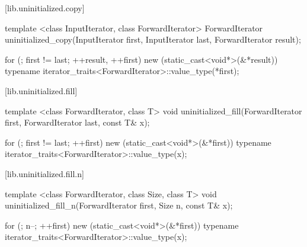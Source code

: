 [lib.uninitialized.copy]{}

%
\begin{itemdecl}
template <class InputIterator, class ForwardIterator>
  ForwardIterator
    uninitialized_copy(InputIterator first, InputIterator last,
                       ForwardIterator result);
\end{itemdecl}

\begin{itemdescr}
\pnum
\effects
\begin{codeblock}
for (; first != last; ++result, ++first)
    new (static_cast<void*>(&*result))
            typename iterator_traits<ForwardIterator>::value_type(*first);
\end{codeblock}

\pnum
\returns
{}
\end{itemdescr}

[lib.uninitialized.fill]{}

%
\begin{itemdecl}
template <class ForwardIterator, class T>
  void uninitialized_fill(ForwardIterator first, ForwardIterator last,
                          const T& x);
\end{itemdecl}

\begin{itemdescr}
\pnum
\effects
\begin{codeblock}
for (; first != last; ++first)
    new (static_cast<void*>(&*first))
            typename iterator_traits<ForwardIterator>::value_type(x);
\end{codeblock}
\end{itemdescr}

[lib.uninitialized.fill.n]{}

%
\begin{itemdecl}
template <class ForwardIterator, class Size, class T>
  void uninitialized_fill_n(ForwardIterator first, Size n, const T& x);
\end{itemdecl}

\begin{itemdescr}
\pnum
\effects
\begin{codeblock}
for (; n--; ++first)
    new (static_cast<void*>(&*first))
            typename iterator_traits<ForwardIterator>::value_type(x);
\end{codeblock}
\end{itemdescr}

